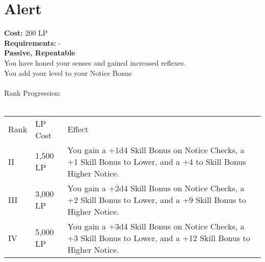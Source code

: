 \section{Alert}\label{perk:alert}
\textbf{Cost:} 200 LP\\
\textbf{Requirements:} -\\
\textbf{Passive, Repeatable}\\
You have honed your senses and gained increased reflexes.\\
You add your level to your Notice Bonus\\
\\
Rank Progression:\\
\\
\begin{longtable}{l | l | p{9cm}}
	Rank & LP Cost  & Effect\\
	II & 1,500 LP & You gain a +1d4 Skill Bonus on Notice Checks, a +1 Skill Bonus to Lower, and a +4 to Skill Bonus Higher Notice.\\
	III & 3,000 LP & You gain a +2d4 Skill Bonus on Notice Checks, a +2 Skill Bonus to Lower, and a +9 Skill Bonus to Higher Notice.\\
	IV & 5,000 LP & You gain a +3d4 Skill Bonus on Notice Checks, a +3 Skill Bonus to Lower, and a +12 Skill Bonus to Higher Notice.\\
\end{longtable}

